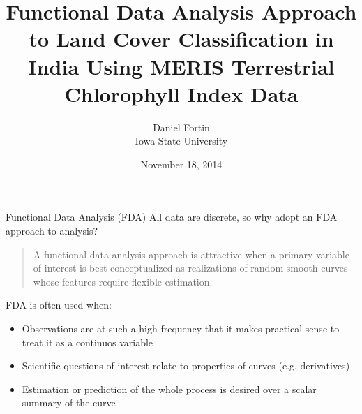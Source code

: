 \documentclass{beamer}
\title{Functional Data Analysis Approach to Land Cover Classification in India Using MERIS Terrestrial Chlorophyll Index Data}
\author[]{Daniel Fortin \\[0.5cm]
Iowa State University}
\date{November 18, 2014}
\begin{document}
\frame{\titlepage}


\begin{frame}[t]{Functional Data Analysis (FDA)}
	All data are discrete, so why adopt an FDA approach to analysis?

	\begin{quote}
 A functional data analysis approach is attractive when a primary variable of interest is best conceptualized as realizations of random smooth curves whose features require flexible estimation.
	\end{quote}
	FDA is often used when:
	\begin{itemize}
		\item Observations are at such a high frequency that it makes practical sense to treat it as a continuos variable
		\item Scientific questions of interest relate to properties of curves (e.g. derivatives)
		\item Estimation or prediction of the whole process is desired over a scalar summary of the curve
	\end{itemize}
\end{frame}



\end{document}
